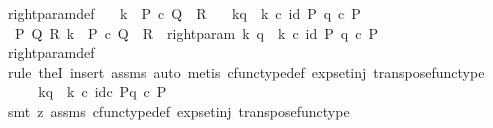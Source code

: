 \begin{isabellebody}
\isamarkupfalse%
\ right{\isacharunderscore}{\kern0pt}param{\isacharunderscore}{\kern0pt}def{}{\isacharcolon}{\kern0pt}\isanewline
\ \ \ {\isachardoublequoteopen}k\ {\isacharcolon}{\kern0pt}\ P\ {\isasymtimes}\isactrlsub c\ Q\ {\isasymrightarrow}\ R{\isachardoublequoteclose}\isanewline
\ \ \ {\isachardoublequoteopen}k\isactrlbsub {\isacharbrackleft}{\kern0pt}{\isacharminus}{\kern0pt}{\isacharcomma}{\kern0pt}q{\isacharbrackright}{\kern0pt}\isactrlesub \ {\isasymequiv}\ k\ {\isasymcirc}\isactrlsub c\ {\isasymlangle}id\ P{\isacharcomma}{\kern0pt}\ q\ {\isasymcirc}\isactrlsub c\ {\isasymbeta}\isactrlbsub P\isactrlesub {\isasymrangle}{\isachardoublequoteclose}\isanewline
%
\isadelimproof
%
\endisadelimproof
%
\isatagproof
{}\isamarkupfalse%
\ {\isacharminus}{\kern0pt}\ \isanewline
\ \ \isamarkupfalse%
\ {\isachardoublequoteopen}{\isasymexists}\ P\ Q\ R{\isachardot}{\kern0pt}\ k\ {\isacharcolon}{\kern0pt}\ P\ {\isasymtimes}\isactrlsub c\ Q\ {\isasymrightarrow}\ R\ {\isasymand}\ right{\isacharunderscore}{\kern0pt}param\ k\ q\ {\isacharequal}{\kern0pt}\ k\ {\isasymcirc}\isactrlsub c\ {\isasymlangle}id\ P{\isacharcomma}{\kern0pt}\ q\ {\isasymcirc}\isactrlsub c\ {\isasymbeta}\isactrlbsub P\isactrlesub {\isasymrangle}{\isachardoublequoteclose}\isanewline
\ \ \ \ \isamarkupfalse%
\ right{\isacharunderscore}{\kern0pt}param{\isacharunderscore}{\kern0pt}def\ \isamarkupfalse%
\ {\isacharparenleft}{\kern0pt}rule\ theI{\isacharprime}{\kern0pt}{\isacharcomma}{\kern0pt}\ insert\ assms{\isacharcomma}{\kern0pt}\ auto{\isacharcomma}{\kern0pt}\ metis\ cfunc{\isacharunderscore}{\kern0pt}type{\isacharunderscore}{\kern0pt}def\ exp{\isacharunderscore}{\kern0pt}set{\isacharunderscore}{\kern0pt}inj\ transpose{\isacharunderscore}{\kern0pt}func{\isacharunderscore}{\kern0pt}type{\isacharparenright}{\kern0pt}\ \isanewline
\ \ \isamarkupfalse%
\ \isamarkupfalse%
\ {\isachardoublequoteopen}k\isactrlbsub {\isacharbrackleft}{\kern0pt}{\isacharminus}{\kern0pt}{\isacharcomma}{\kern0pt}q{\isacharbrackright}{\kern0pt}\isactrlesub \ {\isasymequiv}\ k\ {\isasymcirc}\isactrlsub c\ {\isasymlangle}id\isactrlsub c\ P{\isacharcomma}{\kern0pt}q\ {\isasymcirc}\isactrlsub c\ {\isasymbeta}\isactrlbsub P\isactrlesub {\isasymrangle}{\isachardoublequoteclose}\isanewline
\ \ \ \ \isamarkupfalse%
\ {\isacharparenleft}{\kern0pt}smt\ {\isacharparenleft}{\kern0pt}z{}{\isacharparenright}{\kern0pt}\ assms\ cfunc{\isacharunderscore}{\kern0pt}type{\isacharunderscore}{\kern0pt}def\ exp{\isacharunderscore}{\kern0pt}set{\isacharunderscore}{\kern0pt}inj\ transpose{\isacharunderscore}{\kern0pt}func{\isacharunderscore}{\kern0pt}type{\isacharparenright}{\kern0pt}\isanewline

\end{isabellebody}
